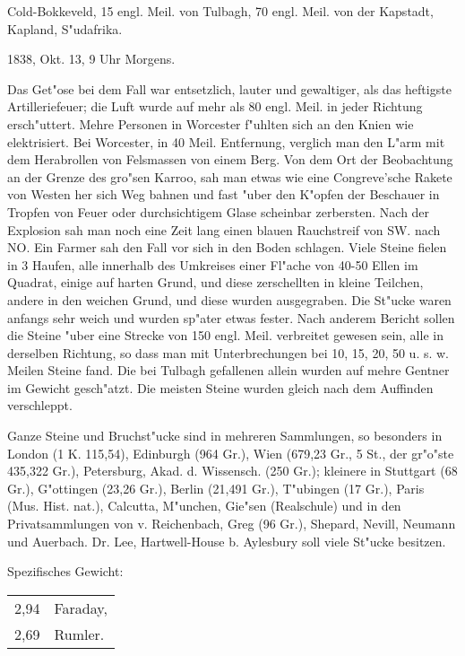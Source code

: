 \documentclass[a4paper, 11pt, oneside]{article}
\begin{document}
Cold-Bokkeveld, 15 engl. Meil. von Tulbagh, 70 engl. Meil. von der Kapstadt, Kapland, S"udafrika.

1838, Okt. 13, 9 Uhr Morgens.

Das Get"ose bei dem Fall war entsetzlich, lauter und gewaltiger, als das heftigste Artilleriefeuer; die Luft wurde auf mehr als 80 engl. Meil. in jeder Richtung ersch"uttert. Mehre Personen in Worcester f"uhlten sich an den Knien wie elektrisiert. Bei Worcester, in 40 Meil. Entfernung, verglich man den L"arm mit dem Herabrollen von Felsmassen von einem Berg. Von dem Ort der Beobachtung an der Grenze des gro"sen Karroo, sah man etwas wie eine Congreve'sche Rakete von Westen her sich Weg bahnen und fast "uber den K"opfen der Beschauer in Tropfen von Feuer oder durchsichtigem Glase scheinbar zerbersten. Nach der Explosion sah man noch eine Zeit lang einen blauen Rauchstreif von SW. nach NO. Ein Farmer sah den Fall vor sich in den Boden schlagen. Viele Steine fielen in 3 Haufen, alle innerhalb des Umkreises einer Fl"ache von 40-50 Ellen im Quadrat, einige auf harten Grund, und diese zerschellten in kleine Teilchen, andere in den weichen Grund, und diese wurden ausgegraben. Die St"ucke waren anfangs sehr weich und wurden sp"ater etwas fester. Nach anderem Bericht sollen die Steine "uber eine Strecke von 150 engl. Meil. verbreitet gewesen sein, alle in derselben Richtung, so dass man mit Unterbrechungen bei 10, 15, 20, 50 u. s. w. Meilen Steine fand. Die bei Tulbagh gefallenen allein wurden auf mehre Gentner im Gewicht gesch"atzt. Die meisten Steine wurden gleich nach dem Auffinden verschleppt.

Ganze Steine und Bruchst"ucke sind in mehreren Sammlungen, so besonders in London (1 K. 115,54), Edinburgh (964 Gr.), Wien (679,23 Gr., 5 St., der gr"o"ste 435,322 Gr.), Petersburg, Akad. d. Wissensch. (250 Gr.); kleinere in Stuttgart (68 Gr.), G"ottingen (23,26 Gr.), Berlin (21,491 Gr.), T"ubingen (17 Gr.), Paris (Mus. Hist. nat.), Calcutta, M"unchen, Gie"sen (Realschule) und in den Privatsammlungen von v. Reichenbach, Greg (96 Gr.), Shepard, Nevill, Neumann und Auerbach. Dr. Lee, Hartwell-House b. Aylesbury soll viele St"ucke besitzen.

Spezifisches Gewicht:  
\begin{table}[!ht]
    \centering
    \begin{tabular}{l l}
        2,94 & Faraday,\\
        2,69 & Rumler.
    \end{tabular}
\end{table}
\end{document}
